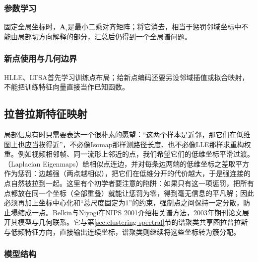 \subsubsection{参数学习}

固定全局坐标时，$\bm A_i$是最小二乘对齐矩阵；将它消去，相当于惩罚邻域坐标中不能由局部切方向解释的部分，汇总后仍得到一个全局谱问题。

\subsubsection{新点使用与几何边界}

HLLE、LTSA首先学习训练点布局；给新点编码还要另设邻域插值或拟合映射，不能把训练特征向量直接当作已知函数。

\subsection{拉普拉斯特征映射}
\label{sec:dim-le}

局部信息有时只需要表达一个很朴素的愿望：“这两个样本是近邻，那它们在低维图上也应当挨得近”，不必像Isomap那样测路径长度、也不必像LLE那样求重构权重。例如视频相邻帧、同一流形上邻近的点，我们希望它们的低维坐标平滑过渡。（Laplacian Eigenmaps）给相似点连边，并对每条边两端的低维坐标之差取平方作为惩罚：边越强（两点越相似），把它们在低维分开的代价越大，于是强连接的点自然被拉到一起。这里有个初学者要注意的陷阱：如果只有这一项惩罚，把所有点都放在同一个坐标（全部重叠）就能让惩罚为零，得到毫无信息的平凡解；因此必须再加上坐标中心化和“总尺度固定为1”的约束，强制点之间保持一定分散，防止塌缩成一点。Belkin与Niyogi在NIPS 2001介绍相关谱方法，2003年期刊论文展开其模型与几何联系。它与第\ref{sec:clustering-spectral}节的谱聚类共享图拉普拉斯与低频特征方向，直接输出连续坐标，谱聚类则继续将这些坐标转为簇分配。

\subsubsection{模型结构}

